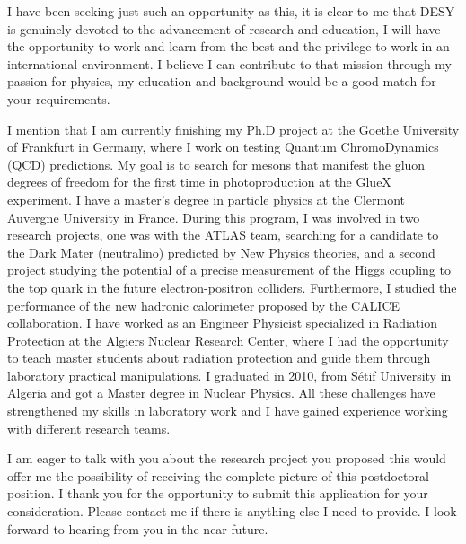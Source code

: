 \documentclass[11pt]{letter}
\begin{document}
I have been seeking just such an opportunity as this, it is clear to me that DESY is genuinely devoted to the advancement of research and education, I will have the opportunity to work and learn from the best and the privilege to work in an international environment. I believe I can contribute to that mission through my passion for physics, my education and background would be a good match for your requirements.
~\par I mention that I am currently finishing my Ph.D project at the Goethe University of Frankfurt in Germany, where I work on testing Quantum ChromoDynamics (QCD) predictions. My goal is to search for mesons that manifest the gluon degrees of freedom for the first time in photoproduction at the GlueX experiment. I have a master's degree in particle physics at the Clermont Auvergne University in France. During this program, I was involved in two research projects, one was with the ATLAS team, searching for a candidate to the Dark Mater (neutralino) predicted by New Physics theories, and a second project studying the potential of a precise measurement of the Higgs coupling to the top quark in the future electron-positron colliders. Furthermore, I studied the performance of the new hadronic calorimeter proposed by the CALICE collaboration. I have worked as an Engineer Physicist specialized in Radiation Protection at the Algiers Nuclear Research Center, where I had the opportunity to teach master students about radiation protection and guide them through laboratory practical manipulations. I graduated in 2010, from S\'etif University in Algeria and got a Master degree in Nuclear Physics.
All these challenges have strengthened my skills in laboratory work and I have gained experience working with different research teams.
~\par I am eager to talk with you about the research project you proposed this would offer me the possibility of receiving the complete picture of this postdoctoral position. I thank you for the opportunity to submit this application for your consideration. Please contact me if there is anything else I need to provide. I look forward to hearing from you in the near future.\\\\
\end{document}
